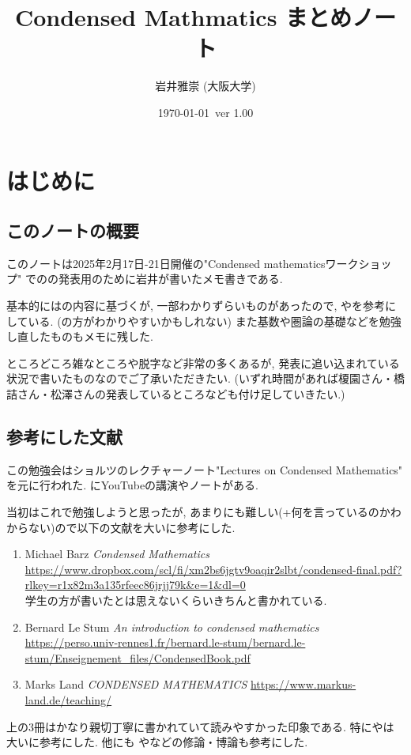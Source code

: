 \documentclass[dvipdfmx,a4paper,11pt]{article}
\title{Condensed Mathmatics まとめノート}
\author{岩井雅崇 (大阪大学)}
\date{\today \, ver 1.00}
\theoremstyle{definition}
\begin{document}
\maketitle
\tableofcontents

\newpage

\setcounter{section}{-1}
\section{はじめに}

\subsection{このノートの概要}
このノートは2025年2月17日-21日開催の"Condensed mathematicsワークショップ"
での\cite[Section 2.A Appendix]{Sch19}の発表用のために岩井が書いたメモ書きである.

 基本的には\cite{Sch19}の内容に基づくが, 一部わかりずらいものがあったので, \cite{Stum}や\cite{Bar22}を参考にしている.
(\cite{Bar22}の方がわかりやすいかもしれない)
また基数や圏論の基礎などを勉強し直したものもメモに残した. 

ところどころ雑なところや脱字など非常の多くあるが, 発表に追い込まれている状況で書いたものなのでご了承いただきたい. (いずれ時間があれば榎園さん・橋詰さん・松澤さんの発表しているところなども付け足していきたい.)

\subsection{参考にした文献}
この勉強会はショルツのレクチャーノート"Lectures on Condensed Mathematics"\cite{Sch19}
を元に行われた. \cite{SchClau}にYouTubeの講演やノートがある.

当初はこれで勉強しようと思ったが, あまりにも難しい(+何を言っているのかわからない)ので以下の文献を大いに参考にした.
\begin{enumerate}
\item \cite{Bar22}
Michael Barz \textit{Condensed Mathematics} \\
\url{https://www.dropbox.com/scl/fi/xm2bs6jgtv9oaqir2slbt/condensed-final.pdf?rlkey=r1x82m3a135rfeec86jrjj79k&e=1&dl=0} \\
学生の方が書いたとは思えないくらいきちんと書かれている.
\item \cite{Stum} Bernard Le Stum
\textit{An introduction to condensed mathematics}
\url{https://perso.univ-rennes1.fr/bernard.le-stum/bernard.le-stum/Enseignement_files/CondensedBook.pdf} 
\item \cite{Land} Marks Land \textit{CONDENSED MATHEMATICS}
\url{https://www.markus-land.de/teaching/}
\end{enumerate}
上の3冊はかなり親切丁寧に書かれていて読みやすかった印象である. 特に\cite{Stum}や\cite{Bar22}は大いに参考にした. 他にも\cite{Asg} や\cite{Lep}などの修論・博論も参考にした. 
\end{document}
